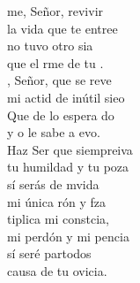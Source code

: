 \begin{cancion}%
	me, Señor, revivir \\
	la vida que te entree\\
	 no tuvo otro sia \\
	que el rme de tu .\\
	, Señor, que se reve \\
	mi actid de inútil sieo\\
	Que de lo espera do \\
	y o le sabe a evo.  \\
\jump
	Haz Ser que siempreiva \\
	tu humildad y tu poza\\
	sí serás de mvida \\
	mi única rón y fza\\
	tiplica mi constcia,\\
	mi perdón y mi pencia\\
	sí seré partodos \\
	causa de tu ovicia.\\
\end{cancion}%
